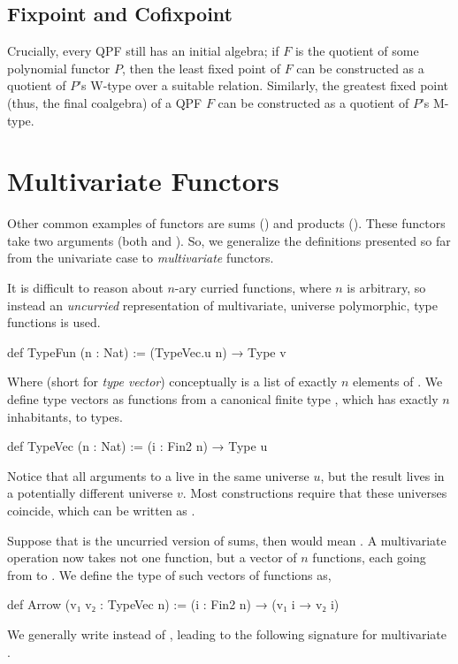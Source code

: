 \subsection*{Fixpoint and Cofixpoint}
Crucially, every QPF still has an initial algebra; if $F$ is the quotient of some polynomial functor
$P$, then the least fixed point of $F$ can be constructed as a quotient of $P$'s W-type over a suitable
relation.
Similarly, the greatest fixed point (thus, the final coalgebra) of a QPF $F$ can be constructed as
a quotient of $P$'s M-type.







\section{Multivariate Functors}%
\label{sec:mvfunctor}

Other common examples of functors are sums () and products ().
These functors take two arguments (both  and ).
So, we generalize the definitions presented so far from the univariate case to \emph{multivariate} functors.

It is difficult to reason about $n$-ary curried functions, where $n$ is arbitrary, so instead an \emph{uncurried} representation of multivariate, universe polymorphic, type functions is used.

\begin{leancode}
    def TypeFun (n : Nat) := (TypeVec.{u} n) → Type v
\end{leancode}
Where  (short for \emph{type vector}) conceptually is a list of exactly $n$ elements of .
We define type vectors as functions from a canonical finite type , which has exactly $n$ inhabitants,
to types.
\begin{leancode}
    def TypeVec (n : Nat) := (i : Fin2 n) → Type u
\end{leancode}
Notice that all arguments to a  live in the same universe $u$, but the result lives in a potentially different universe $v$. 
Most constructions require that these universes coincide, which can be written as .

Suppose that  is the uncurried version of sums, then  would mean .
A multivariate  operation now takes not one function, but a vector of $n$ functions, each going from  to . We define the type of such vectors of functions as,
\begin{leancode}    
    def Arrow (v₁ v₂ : TypeVec n) := (i : Fin2 n) → (v₁ i → v₂ i)
\end{leancode}  
We generally write  instead of , leading to the following signature
for multivariate .

